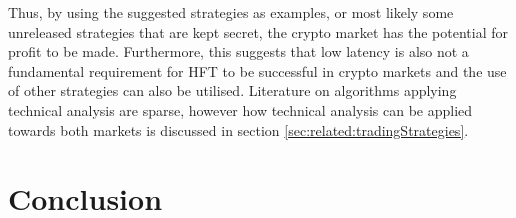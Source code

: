 Thus, by using the suggested strategies as examples, or most likely some unreleased strategies that are kept secret, the crypto market has the potential for profit to be made. Furthermore, this suggests that low latency is also not a fundamental requirement for HFT to be successful in crypto markets and the use of other strategies can also be utilised. Literature on algorithms applying technical analysis are sparse, however how technical analysis can be applied towards both markets is discussed in section \ref{sec:related:tradingStrategies}.

\section{Conclusion}
\label{sec:related:conclusion}

